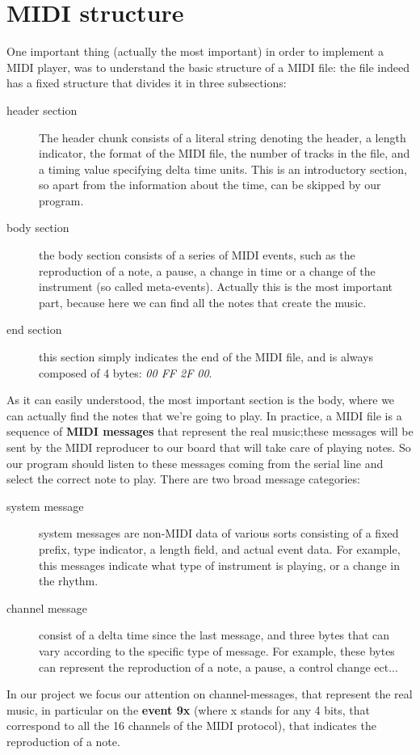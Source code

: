 \documentclass[12pt]{article}
\begin{document}
\section{MIDI structure} \label{sec:structure}
One important thing (actually the most important) in order to implement a MIDI player, was to understand the basic structure of a MIDI file: the file indeed has a fixed structure that divides it in three subsections: 
\begin{description} 
	\item[header section] The header chunk consists of a literal string denoting the header, a length indicator, the format of the MIDI file, the number of tracks in the file, and a timing value specifying delta time units. This is an introductory section, so apart from the information about the time, can be skipped by our program.
	\item[body section] the body section consists of a series of MIDI events, such as the reproduction of a note, a pause, a change in time or a change of the instrument (so called meta-events). Actually this is the most important part, because here we can find all the notes that create the music.
	\item[end section] this section simply indicates the end of the MIDI file, and is always composed of 4 bytes: \emph{00 FF 2F 00}.
\end{description}
As it can easily understood, the most important section is the body, where we can actually find the notes that we're going to play. In practice, a MIDI file is a sequence of \textbf{MIDI messages} that represent the real music;these messages will be sent by the MIDI reproducer to our board that will take care of playing notes. So our program should listen to these messages coming from the serial line and select the correct note to play.\newline 
There are two broad message categories: 
\begin{description} 
	\item[system message] system messages are non-MIDI data of various sorts consisting of a fixed prefix, type indicator, a length field, and actual event data. For example, this messages indicate what type of instrument is playing, or a change in the rhythm.
	\item[channel message] consist of a delta time since the last message, and three bytes that can vary according to the specific type of message. For example, these bytes can represent the reproduction of a note, a pause, a control change ect...
\end{description}
In our project we focus our attention on channel-messages, that represent the real music, in particular on the \textbf{event 9x} (where x stands for any 4 bits, that correspond to all the 16 channels of the MIDI protocol), that indicates the reproduction of a note.
\end{document}
